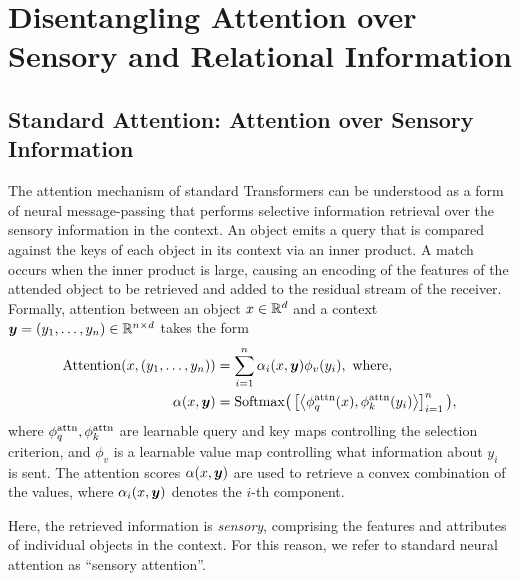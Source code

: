 \section{Disentangling Attention over Sensory and Relational Information}

\subsection{Standard Attention: Attention over Sensory Information}

The attention mechanism of standard Transformers can be understood as a form of neural message-passing that performs selective information retrieval over the sensory information in the context. An object emits a query that is compared against the keys of each object in its context via an inner product. A match occurs when the inner product is large, causing an encoding of the features of the attended object to be retrieved and added to the residual stream of the receiver. Formally, attention between an object $x \in \mathbb{R}^d$ and a context $\bm{y} = (y_1, \ldots, y_n) \in \mathbb{R}^{n \times d}$ takes the form
\begin{equation}\label{eq:self_attn}
  \begin{split}
    \Attn(x, \ys) &= \sum_{i=1}^{n} \alpha_i(x, \y) \phi_v(y_i), \ \text{where}, \\
    \alpha(x, \y) &= \Softmax\bigparen{\bra{\iprod{\phiqattn(x)}{\phikattn(y_i)}}_{i=1}^{n}},
  \end{split}
\end{equation}
where $\phi_q^{\mathrm{attn}},\phi_k^{\mathrm{attn}}$ are learnable query and key maps controlling the selection criterion, and $\phi_v$ is a learnable value map controlling what information about $y_i$ is sent. The attention scores $\alpha(x, \bm{y})$ are used to retrieve a convex combination of the values, where $\alpha_i(x, \bm{y})$ denotes the $i$-th component.

Here, the retrieved information is \textit{sensory}, comprising the features and attributes of individual objects in the context. For this reason, we refer to standard neural attention as ``sensory attention''.


